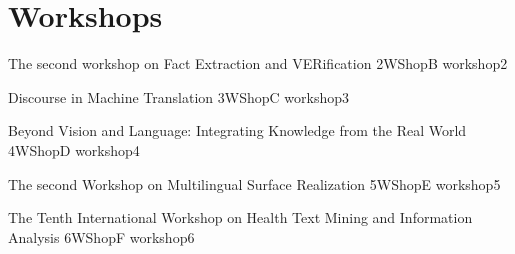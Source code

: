 \chapter[Workshops: \daydate]{Workshops}
\thispagestyle{emptyheader}
\vfill




\clearpage
{}

      


\begin{wsschedule}
 {The second workshop on Fact Extraction and VERification}
 {2}{WShopB}
 {workshop2}
 {\WShopLocB}
 
\end{wsschedule}
      
\begin{wsschedule}
 {Discourse in Machine Translation}
 {3}{WShopC}
 {workshop3}
 {\WShopLocC}
 
\end{wsschedule}

\begin{wsschedule}
 {Beyond Vision and Language: Integrating Knowledge from the Real World}
 {4}{WShopD}
 {workshop4}
 {\WShopLocD}
 
\end{wsschedule}

\begin{wsschedule}
 {The second Workshop on Multilingual Surface Realization}
 {5}{WShopE}
 {workshop5}
 {\WShopLocE}
 
\end{wsschedule}

\begin{wsschedule}
 {The Tenth International Workshop on Health Text Mining and Information Analysis}
 {6}{WShopF}
 {workshop6}
 {\WShopLocF}
 
\end{wsschedule}

